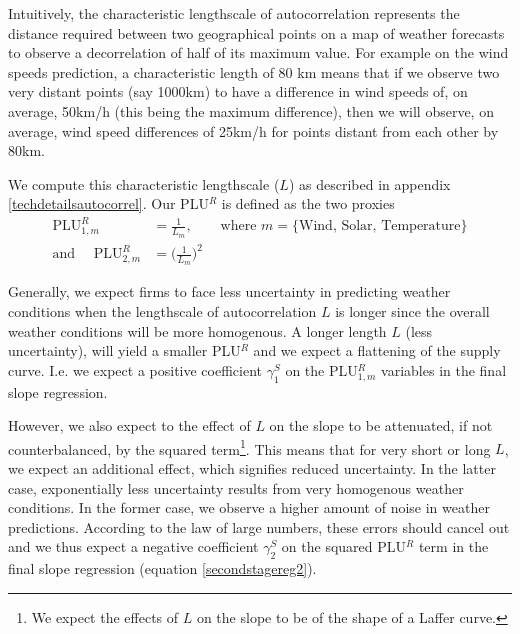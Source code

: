 Intuitively, the characteristic lengthscale of autocorrelation represents the distance required between two geographical points on a map of weather forecasts to observe a decorrelation of half of its maximum value.
For example on the wind speeds prediction, a characteristic length of 80 km means that 
if we observe two very distant points (say 1000km) to have a difference in wind speeds of, on average, 50km/h (this being the maximum difference), then we will observe, on average, wind speed differences of 25km/h for points distant from each other by 80km. 


We compute this characteristic lengthscale ($L$) as described in appendix \ref{techdetailsautocorrel}. Our PLU$^R$ is defined as the two proxies 
\begin{align}
 \text{PLU}^R_{1,m} &= \frac{1}{L_m}, \quad \quad  \text{where } m=\{\text{Wind, Solar, Temperature}\} \\
  \text{and }  \quad \text{PLU}^R_{2,m} &=  \bigl(\frac{1}{L_m}\bigr)^2
\end{align}

Generally, we expect firms to face less uncertainty in predicting weather conditions when the lengthscale of autocorrelation $L$ is longer since the overall weather conditions will be more homogenous. A longer length $L$ (less uncertainty), will yield a smaller PLU$^R$ and we expect a flattening of the supply curve. I.e. we expect a positive coefficient $\gamma^S_1$ on the PLU$^R_{1,m}$ variables in the final slope regression.

However, we also expect to the effect of $L$ on the slope to be attenuated, if not counterbalanced, by the squared term\footnote{We expect the effects of $L$ on the slope to be of the shape of a Laffer curve.}. This means that for very short or long $L$, we expect an additional effect, which signifies reduced uncertainty. In the latter case, exponentially less uncertainty results from very homogenous weather conditions. In the former case, we observe a higher amount of noise in weather predictions. According to the law of large numbers, these errors should cancel out and we thus expect a negative coefficient $\gamma^S_2$ on the squared PLU$^R$ term in the final slope regression (equation \ref{secondstagereg2}). 

